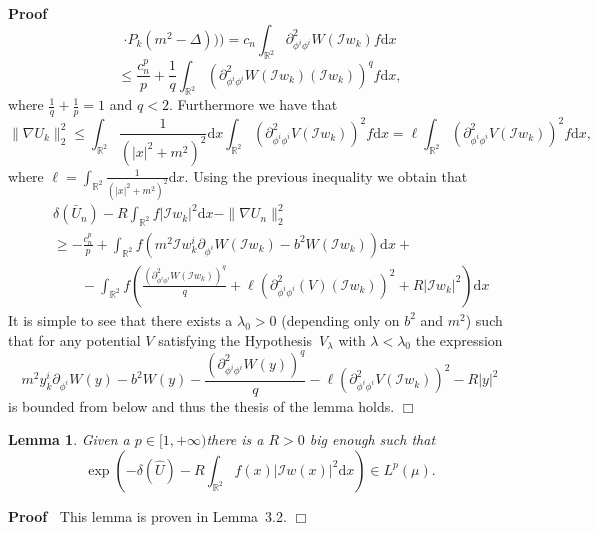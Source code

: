 \documentclass[a4paper,10pt]{article}
\newcommand{\mathd}{\mathrm{d}}
\newenvironment{proof}{\noindent\textbf{Proof\ }}{\hspace*{\fill}$\Box$\medskip}
\newtheorem{lemma}{Lemma}
\begin{document}
\begin{proof}
\[     \cdot P_k (m^2 - \Delta))) = c_n \int_{\mathbb{R}^2} \partial_{\phi^i
     \phi^i}^2 W (\mathcal{I}w_k) f \mathd x \]
  \[ \leqslant \frac{c_n^p}{p} + \frac{1}{q} \int_{\mathbb{R}^2}
     (\partial_{\phi^i \phi^i}^2 W (\mathcal{I}w_k) (\mathcal{I}w_k))^q f
     \mathd x, \]
  where $\frac{1}{q} + \frac{1}{p} = 1$ and $q < 2$. Furthermore we have that
  \[ \| \nabla U_k \|^2_2 \leqslant \int_{\mathbb{R}^2} \frac{1}{(| x |^2 +
     m^2)^2} \mathd x \int_{\mathbb{R}^2} (\partial_{\phi^i \phi^i}^2 V
     (\mathcal{I}w_k))^2 f \mathd x = \ell \int_{\mathbb{R}^2}
     (\partial_{\phi^i \phi^i}^2 V (\mathcal{I}w_k))^2 f \mathd x, \]
  where $\ell = \int_{\mathbb{R}^2} \frac{1}{(| x |^2 + m^2)^2} \mathd x$.
  Using the previous inequality we obtain that
  \begin{eqnarray}
    &  & \delta (\bar{U}_n) - R \int_{\mathbb{R}^2} f | \mathcal{I}w_k |^2
    \mathd x - \| \nabla U_n \|^2_2 \nonumber\\
    &  & \geqslant - \frac{c_n^p}{p} + \int_{\mathbb{R}^2} f (m^2
    \mathcal{I}w^i_k \partial_{\phi^i} W (\mathcal{I}w_k) - b^2 W
    (\mathcal{I}w_k)) \mathd x + \nonumber\\
    &  & \qquad - \int_{\mathbb{R}^2} f \left( \frac{(\partial_{\phi^i
    \phi^i}^2 W (\mathcal{I}w_k))^q}{q} + \ell (\partial_{\phi^i \phi^i}^2 (V)
    (\mathcal{I}w_k))^2 + R | \mathcal{I}w_k |^2 \right) \mathd x \nonumber
  \end{eqnarray}
  It is simple to see that there exists a $\lambda_0 > 0$ (depending only on
  $b^2$ and $m^2$) such that for any potential $V$ satisfying the
  Hypothesis~$V_{\lambda}$ with $\lambda < \lambda_0$ the expression
  \[ m^2 y^i_k \partial_{\phi^i} W (y) - b^2 W (y) - \frac{(\partial_{\phi^i
     \phi^i}^2 W (y))^q}{q} - \ell (\partial_{\phi^i \phi^i}^2 V
     (\mathcal{I}w_k))^2 - R | y |^2 \]
  is bounded from below and thus the thesis of the lemma holds.
\end{proof}

\begin{lemma}
  \label{lemma_inequality4}Given a $p \in [1, + \infty) $there is a $R > 0$
  big enough such that
  \[ \exp \left( - \delta (\hat{U}) - R \int_{\mathbb{R}^2} f (x) |
     \mathcal{I}w (x) |^2 \mathd x \right) \in L^p (\mu) . \]
\end{lemma}

\begin{proof}
  This lemma is proven in {\cite{Klein1984}} Lemma~3.2. 
\end{proof}
\end{document}

